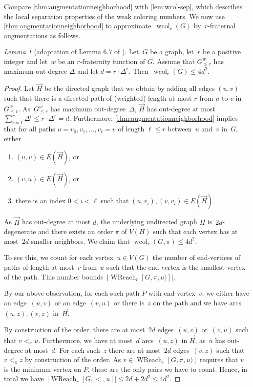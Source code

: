 \documentclass[1p,number,a4paper]{elsarticle}
\theoremstyle{remark}
\DeclareMathOperator{\wcol}{wcol}
\DeclareMathOperator{\WReach}{WReach}
\newtheorem{lemma}[theorem]{Lemma}
\begin{document}
Compare \cref{thm:augmentationneighborhood} with 
\cref{lem:wcol-sep}, which describes the local separation properties 
of the weak coloring numbers. We now use 
\cref{thm:augmentationneighborhood} to approximate~$\wcol_r(G)$ by~$r$-fraternal augmentations as follows.

\begin{lemma}[adaptation of Lemma 6.7 of \cite{grohe2017deciding}]\label{thm:approximatingcol}
  Let~$G$ be a graph, let~$r$ be a positive integer and let~$w$ be an $r$-fraternity function of $G$. Assume that 
  $G^w_{\leq r}$ has maximum out-degree $\Delta$ and let 
  $d=r\cdot \Delta^{r}$. Then~$\wcol_r(G)\leq 4d^2$.
\end{lemma}
\begin{proof}
Let $\vec{H}$ be the directed graph that we obtain by 
adding all edges $(u,v)$ such that there is a directed path 
of (weighted) length at most $r$ from $u$ to $v$ in 
$G^w_{\leq r}$. As~$G^w_{\leq r}$ has maximum out-degree~$\Delta$, $\vec{H}$ has out-degree at most $\sum_{i=1}^r\Delta^i \leq
r\cdot \Delta^r=d$. 
Furthermore, \cref{thm:augmentationneighborhood} implies that
for all paths $u=v_0, v_1,\ldots, v_\ell=v$ of length $\ell\leq r$
 between~$u$ and~$v$ in~$G$, either
  \begin{enumerate}
	\item $(u,v)\in E(\vec H)$, or 
    \item $(v,u)\in E(\vec H)$, or 
    \item there is an index $0<i<\ell$ such that 
    $(u,v_i), (v,v_i)\in E(\vec{H})$. 
  \end{enumerate}

As $\vec{H}$ has out-degree at most $d$, the underlying undirected
graph $H$ is~$2d$-degenerate and there exists an order $\pi$ of 
$V(H)$ such that each vertex has at most~$2d$ smaller neighbors. 
We claim that $\wcol_r(G,\pi)\leq 4d^2$. 

To see this, we count for each vertex~$u\in V(G)$ the number of
end-vertices of paths of length at most~$r$ from~$u$ such that 
the end-vertex is the smallest vertex of the path. This number
bounds~$|\WReach_r[G,\pi, u)]|$.

By our above observation, for each such path $P$
with end-vertex~$v$, we either have an edge~$(u,v)$ or an
edge~$(v,u)$ or there is~$z$ on the path and we have arcs~$(u,z),
(v,z)$ in~$\vec{H}$.

By construction of the order, there are at most~$2d$ 
edges~$(u,v)$ or~$(v,u)$ such that $v<_\pi u$. Furthermore, 
we have at most~$d$ arcs~$(u,z)$ in $\vec{H}$, as~$u$ has 
out-degree at most~$d$. For each such~$z$ there are at 
most~$2d$ edges~$(v,z)$ such that~$v<_\pi z$ by 
construction of the order. As $v\in \WReach_r[G,\pi, u)]$ 
requires that $v$ is the minimum vertex on $P$, these are the 
only pairs we have to count. Hence, in total we 
have~$|\WReach_r[G,<,u]|\leq 2d+2d^2\leq 4d^2$.
\end{proof}
\end{document}
